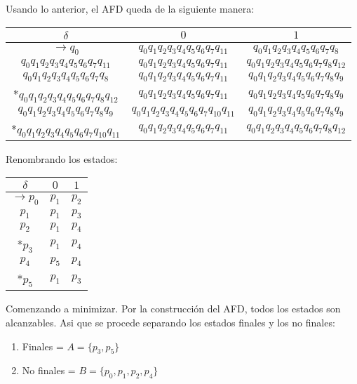 {    Usando lo anterior, el AFD queda de la siguiente manera:
    \begin{center}
      \centering
        \begin{tabular}{c|c|c}
            $\delta$ & $0$ & $1$ \\ \hline
            $\rightarrow q_0$ & $q_0q_1q_2q_3q_4q_5q_6q_7q_{11}$ & $q_0q_1q_2q_3q_4q_5q_6q_7q_8$ \\
            $q_0q_1q_2q_3q_4q_5q_6q_7q_{11}$ & $q_0q_1q_2q_3q_4q_5q_6q_7q_{11}$& $q_0q_1q_2q_3q_4q_5q_6q_7q_8q_{12}$\\
            $q_0q_1q_2q_3q_4q_5q_6q_7q_8$ & $q_0q_1q_2q_3q_4q_5q_6q_7q_{11}$& $q_0q_1q_2q_3q_4q_5q_6q_7q_8q_9$\\
            *$q_0q_1q_2q_3q_4q_5q_6q_7q_8q_{12}$ & $q_0q_1q_2q_3q_4q_5q_6q_7q_{11}$ & $q_0q_1q_2q_3q_4q_5q_6q_7q_8q_9$\\
            $q_0q_1q_2q_3q_4q_5q_6q_7q_8q_9$ & $q_0q_1q_2q_3q_4q_5q_6q_7q_{10}q_{11}$& $q_0q_1q_2q_3q_4q_5q_6q_7q_8q_9$ \\
            *$q_0q_1q_2q_3q_4q_5q_6q_7q_{10}q_{11}$ & $q_0q_1q_2q_3q_4q_5q_6q_7q_{11}$& $q_0q_1q_2q_3q_4q_5q_6q_7q_8q_{12}$
        \end{tabular}
    \end{center}

    Renombrando los estados:
    \begin{center}
      \centering
        \begin{tabular}{c|c|c}
            $\delta$ & $0$ & $1$ \\ \hline
            $\rightarrow p_0$ & $p_1$ & $p_2$ \\
            $p_1$ & $p_1$ & $p_3$\\
            $p_2$ & $p_1$ & $p_4$\\
            *$p_3$ & $p_1$ & $p_4$\\
            $p_4$ & $p_5$ & $p_4$ \\
            *$p_5$ & $p_1$ & $p_3$ 
        \end{tabular}
    \end{center}

    Comenzando a minimizar. Por la construcción del AFD, todos los estados son alcanzables. Asi que se procede separando los estados finales y los no finales:
    \begin{enumerate}
      \item Finales = $A = \{p_3, p_5\}$
      \item No finales = $B = \{p_0, p_1, p_2, p_4\}$
    \end{enumerate}

}
